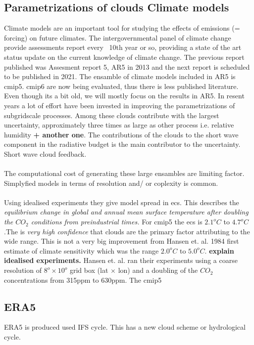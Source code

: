 \subsection{Parametrizations of clouds Climate models} \label{sec:params_climate_models}
Climate models are an important tool for studying the effects of emissions (= forcing) on future climates. The intergovernmental panel of climate change provide assessments report every ~10th year or so, providing a state of the art status update on the current knowledge of climate change. The previous report published was Assesment report 5, AR5 in 2013 and the next report is scheduled to be published in 2021. The ensamble of climate models included in AR5 is \acrfull{cmip5}. \acrshort{cmip6} are now being evaluated, thus there is less published literature. Even though its a bit old, we will mostly focus on the results in AR5. In resent years a lot of effort have been invested in improving the parametrizations of subgridscale processes. Among these clouds contribute with the largest uncertainty, approximately three times as large as other process i.e. relative humidity\textbf{ + another one}. The contributions of the clouds to the short wave component in the radiative budget is the main contributor to the uncertainty. Short wave cloud feedback. 
\\ \\
The computational cost of generating these large ensambles are limiting factor. Simplyfied models in terms of resolution and/ or coplexity is common. 
\\ \\ 
Using idealised experiments they give model spread in \acrfull{ecs}. This describes the \textit{equilibrium change in global and annual mean surface temperature after doubling the $CO_2$ conditions from preindustrial times.}
For \acrshort{cmip5} the \acrshort{ecs} is $2.1^oC$ to $4.7^oC$.The is \textit{very high confidence} that clouds are the primary factor attributing to the wide range. This is not a very big improvement from Hansen et. al. 1984 first estimate of climate sensitivity which was the range $2.0^oC$ to $5.0^oC$. \textbf{explain idealised experiments.} Hansen et. al. ran their experiments using a coarse resolution of $8^o \times 10^o$ grid box (lat $\times$ lon) and a doubling of the $CO_2$ concentrations from 315ppm to 630ppm. The \acrshort{cmip5} 

\subsection{ERA5} \label{sec:param_ERA5}
ERA5 is produced used IFS cycle. This has a new cloud scheme or hydrological cycle. 


